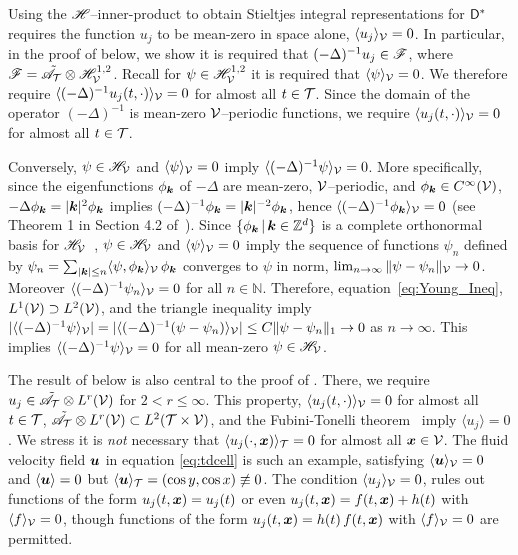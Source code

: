 \documentclass[amsa]{ipart}
\begin{document}
Using the $\mathscr{H}$--inner-product to obtain Stieltjes integral
representations for $\mathsf{D}^*$ requires the function $u_j$ to be
mean-zero in space alone, $\langle u_j\rangle_{\mathcal{V}}=0$. In particular, in the
proof of  below, we show it is required that
$(-\Delta)^{-1}u_j\in\mathscr{F}$, where
$\mathscr{F}=\tilde{\mathscr{A}}_{\mathcal{T}}\otimes\mathscr{H}^{1,2}_{\mathcal{V}}$. Recall for
$\psi\in\mathscr{H}^{1,2}_{\mathcal{V}}$ it is required that $\langle\psi\rangle_{\mathcal{V}}=0$. We 
therefore require $\langle(-\Delta)^{-1}u_j(t,\cdot)\rangle_{\mathcal{V}}=0$ for almost all
$t\in\mathcal{T}$. Since the domain of the operator $(-\Delta)^{-1}$ is mean-zero
$\mathcal{V}$--periodic functions, we require $\langle u_j(t,\cdot)\rangle_{\mathcal{V}}=0$ for almost
all  $t\in\mathcal{T}$.



Conversely, $\psi\in\mathscr{H}_{\mathcal{V}}$ and $\langle\psi\rangle_{\mathcal{V}}=0$ imply
$\langle(-\Delta)^{-1}\psi\rangle_{\mathcal{V}}=0$. More specifically, since the eigenfunctions  
$\phi_{\boldsymbol{k}}$ of $-\Delta$ are mean-zero, $\mathcal{V}$--periodic, and $\phi_{\boldsymbol{k}}\in
C^\infty(\mathcal{V})$, $-\Delta\phi_{\boldsymbol{k}}=|\boldsymbol{k}|^2\phi_{\boldsymbol{k}}$ implies
$(-\Delta)^{-1}\phi_{\boldsymbol{k}}=|\boldsymbol{k}|^{-2}\phi_{\boldsymbol{k}}$, hence
$\langle(-\Delta)^{-1}\phi_{\boldsymbol{k}}\rangle_{\mathcal{V}}=0$ (see Theorem 1 in Section 4.2 
of~\cite{McOwen:2003:PDE}). Since $\{\phi_{\boldsymbol{k}}\,|\,\boldsymbol{k}\in\mathbb{Z}^d\}$
is a complete orthonormal basis for
$\mathscr{H}_{\mathcal{V}}$~\cite{Folland:99:RealAnalysis}, $\psi\in\mathscr{H}_{\mathcal{V}}$ and
$\langle\psi\rangle_{\mathcal{V}}=0$ imply the sequence of functions $\psi_n$ defined by 
$\psi_n=\sum_{|\boldsymbol{k}|\leq   n}\langle\psi,\phi_{\boldsymbol{k}}\rangle_{\mathcal{V}}\,\phi_{\boldsymbol{k}}$ converges to
$\psi$ in norm, $\lim_{n\to\infty}\|\psi-\psi_n\|_{\mathcal{V}}\to0$. Moreover
$\langle(-\Delta)^{-1}\psi_n\rangle_{\mathcal{V}}=0$ for all
$n\in\mathbb{N}$. Therefore, equation~\eqref{eq:Young_Ineq}, $L^1(\mathcal{V})\supset
L^2(\mathcal{V})$, and the triangle inequality imply 
$|\langle(-\Delta)^{-1}\psi\rangle_{\mathcal{V}}|=|\langle(-\Delta)^{-1}(\psi-\psi_n)\rangle_{\mathcal{V}}|\leq C\|\psi-\psi_n\|_1\to0$
as $n\to\infty$. This implies $\langle(-\Delta)^{-1}\psi\rangle_{\mathcal{V}}=0$ for all mean-zero
$\psi\in\mathscr{H}_{\mathcal{V}}$.    






The result of  below is also central to the
proof of . There, we require
$u_j\in\tilde{\mathscr{A}}_{\mathcal{T}}\otimes L^r(\mathcal{V})$ for $2<r\leq\infty$. This property,
$\langle u_j(t,\cdot)\rangle_{\mathcal{V}}=0$ for almost all $t\in\mathcal{T}$, 
$\tilde{\mathscr{A}}_{\mathcal{T}}\otimes L^r(\mathcal{V})\subset L^2(\mathcal{T}\times\mathcal{V})$, and the
Fubini-Tonelli theorem~\cite{Folland:99:RealAnalysis}  imply $\langle
u_j\rangle=0$. We stress it is  
\emph{not} necessary that $\langle u_j(\cdot,\boldsymbol{x})\rangle_{\mathcal{T}}=0$ for almost all
$\boldsymbol{x}\in\mathcal{V}$. The fluid velocity
field $\boldsymbol{u}$ in equation \eqref{eq:tdcell} is such an example,
satisfying $\langle\boldsymbol{u}\rangle_{\mathcal{V}}=0$ and $\langle\boldsymbol{u}\rangle=0$ but
$\langle\boldsymbol{u}\rangle_{\mathcal{T}}=(\cos{y},\cos{x})\not\equiv0$. The condition $\langle
u_j\rangle_{\mathcal{V}}=0$, rules out functions of the form $u_j(t,\boldsymbol{x})=u_j(t)$
or even $u_j(t,\boldsymbol{x})=f(t,\boldsymbol{x})+h(t)$ with $\langle f\rangle_{\mathcal{V}}=0$, though
functions of the form $u_j(t,\boldsymbol{x})=h(t)\,f(t,\boldsymbol{x})$ with $\langle
f\rangle_{\mathcal{V}}=0$ are permitted.  
\end{document}
